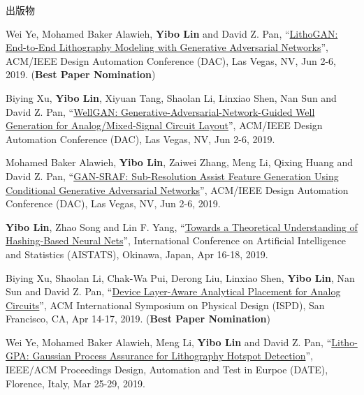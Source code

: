 \begin{rSection}{出版物}
\begin{description}[font=\normalfont]
\item[{[C27]}]{
        Wei Ye, Mohamed Baker Alawieh, \textbf{Yibo Lin} and David Z. Pan, 
    ``\href{https://doi.org/10.1145/3316781.3317852}{LithoGAN: End-to-End Lithography Modeling with Generative Adversarial Networks}'', 
    ACM/IEEE Design Automation Conference (DAC), Las Vegas, NV, Jun 2-6, 2019.
    (\textbf{Best Paper Nomination})
}
            

\item[{[C26]}]{
        Biying Xu, \textbf{Yibo Lin}, Xiyuan Tang, Shaolan Li, Linxiao Shen, Nan Sun and David Z. Pan, 
    ``\href{https://doi.org/10.1145/3316781.3317930}{WellGAN: Generative-Adversarial-Network-Guided Well Generation for Analog/Mixed-Signal Circuit Layout}'', 
    ACM/IEEE Design Automation Conference (DAC), Las Vegas, NV, Jun 2-6, 2019.
    
}
            

\item[{[C25]}]{
        Mohamed Baker Alawieh, \textbf{Yibo Lin}, Zaiwei Zhang, Meng Li, Qixing Huang and David Z. Pan, 
    ``\href{https://doi.org/10.1145/3316781.3317832}{GAN-SRAF: Sub-Resolution Assist Feature Generation Using Conditional Generative Adversarial Networks}'', 
    ACM/IEEE Design Automation Conference (DAC), Las Vegas, NV, Jun 2-6, 2019.
    
}
            

\item[{[C24]}]{
        \textbf{Yibo Lin}, Zhao Song and Lin F. Yang, 
    ``\href{https://arxiv.org/abs/1812.10244}{Towards a Theoretical Understanding of Hashing-Based Neural Nets}'', 
    International Conference on Artificial Intelligence and Statistics (AISTATS), Okinawa, Japan, Apr 16-18, 2019.
    
}
            

\item[{[C23]}]{
        Biying Xu, Shaolan Li, Chak-Wa Pui, Derong Liu, Linxiao Shen, \textbf{Yibo Lin}, Nan Sun and David Z. Pan, 
    ``\href{https://doi.org/10.1145/3299902.3309751}{Device Layer-Aware Analytical Placement for Analog Circuits}'', 
    ACM International Symposium on Physical Design (ISPD), San Francisco, CA, Apr 14-17, 2019.
    (\textbf{Best Paper Nomination})
}
            

\item[{[C22]}]{
        Wei Ye, Mohamed Baker Alawieh, Meng Li, \textbf{Yibo Lin} and David Z. Pan, 
    ``\href{https://doi.org/10.23919/DATE.2019.8714960}{Litho-GPA: Gaussian Process Assurance for Lithography Hotspot Detection}'', 
    IEEE/ACM Proceedings Design, Automation and Test in Eurpoe (DATE), Florence, Italy, Mar 25-29, 2019.
    
}
\end{description}
\end{rSection}
